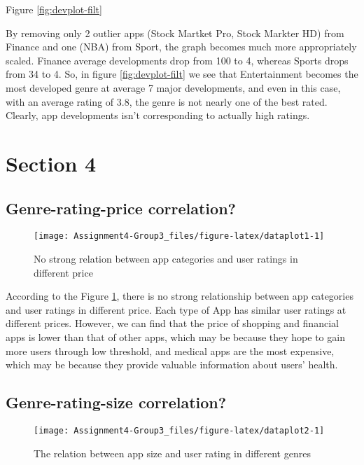 \documentclass[
]{article}
\begin{document}
Figure \ref{fig:devplot-filt}

By removing only 2 outlier apps (Stock Martket Pro, Stock Markter HD) from Finance and one (NBA) from Sport, the graph becomes much more appropriately scaled. Finance average developments drop from 100 to 4, whereas Sports drops from 34 to 4.
So, in figure \ref{fig:devplot-filt} we see that Entertainment becomes the most developed genre at average 7 major developments, and even in this case, with an average rating of 3.8, the genre is not nearly one of the best rated. Clearly, app developments isn't corresponding to actually high ratings.

\hypertarget{section-4}{%
\section{Section 4}\label{section-4}}

\hypertarget{genre-rating-price-correlation}{%
\subsection{Genre-rating-price correlation?}\label{genre-rating-price-correlation}}

\begin{figure}

{\centering \texttt{[image: Assignment4-Group3\_files/figure-latex/dataplot1-1]} 

}

\caption{No strong relation between app categories and user ratings in different price}\label{fig:dataplot1}
\end{figure}

According to the Figure \ref{fig:dataplot1}, there is no strong relationship between app categories and user ratings in different price. Each type of App has similar user ratings at different prices. However, we can find that the price of shopping and financial apps is lower than that of other apps, which may be because they hope to gain more users through low threshold, and medical apps are the most expensive, which may be because they provide valuable information about users' health.

\hypertarget{genre-rating-size-correlation}{%
\subsection{Genre-rating-size correlation?}\label{genre-rating-size-correlation}}

\begin{figure}

{\centering \texttt{[image: Assignment4-Group3\_files/figure-latex/dataplot2-1]} 

}

\caption{The relation between app size and user rating in different genres}\label{fig:dataplot2}
\end{figure}
\end{document}

